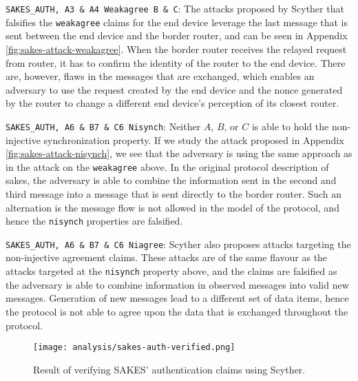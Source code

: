 \begin{list}{•}{}

\item \texttt{SAKES\_AUTH, A3 \& A4 Weakagree B \& C}: The attacks proposed by Scyther that falsifies the \texttt{weakagree} claims for the end device leverage the last message that is sent between the end device and the border router, and can be seen in Appendix \ref{fig:sakes-attack-weakagree}. When the border router receives the relayed request from router, it has to confirm the identity of the router to the end device. There are, however, flaws in the messages that are exchanged, which enables an adversary to use the request created by the end device and the nonce generated by the router to change a different end device's perception of its closest router.

\item \texttt{SAKES\_AUTH, A6 \& B7 \& C6 Nisynch}: Neither $A$, $B$, or $C$ is able to hold the non-injective synchronization property. If we study the attack proposed in Appendix \ref{fig:sakes-attack-nisynch}, we see that the adversary is using the same approach as in the attack on the \texttt{weakagree} above. In the original protocol description of \gls{sakes}, the adversary is able to combine the information sent in the second and third message into a message that is sent directly to the border router. Such an alternation is the message flow is not allowed in the model of the protocol, and hence the \texttt{nisynch} properties are falsified.

\item \texttt{SAKES\_AUTH, A6 \& B7 \& C6 Niagree}: Scyther also proposes attacks targeting the non-injective agreement claims. These attacks are of the same flavour as the attacks targeted at the \texttt{nisynch} property above, and the claims are falsified as the adversary is able to combine information in observed messages into valid new messages. Generation of new messages lead to a different set of data items, hence the protocol is not able to agree upon the data that is exchanged throughout the protocol.

\end{list}

\begin{figure}[h]
	\centering
	\texttt{[image: analysis/sakes-auth-verified.png]}
	\caption{Result of verifying SAKES' authentication claims using Scyther.}
	\label{fig:sakes-verified-auth}
\end{figure}

